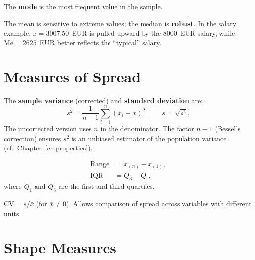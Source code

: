 \begin{definition}[Mode]
The \textbf{mode} is the most frequent value in the sample.
\end{definition}

\begin{intuition}
The mean is sensitive to extreme values; the median is \textbf{robust}. In the salary example, $\bar{x}=3007.50$~EUR is pulled upward by the 8000~EUR salary, while $\mathrm{Me}=2625$~EUR better reflects the ``typical'' salary.
\end{intuition}

\section{Measures of Spread}

\begin{definition}
The \textbf{sample variance} (corrected) and \textbf{standard deviation} are:
\[
s^2 = \frac{1}{n-1}\sum_{i=1}^{n}(x_i-\bar{x})^2, \qquad s = \sqrt{s^2}.
\]
The uncorrected version uses $n$ in the denominator. The factor $n-1$ (Bessel's correction) ensures $s^2$ is an unbiased estimator of the population variance (cf.\ Chapter~\ref{ch:properties}).
\end{definition}

\begin{definition}
\begin{align}
\text{Range} &= x_{(n)} - x_{(1)}, \\
\text{IQR} &= Q_3 - Q_1,
\end{align}
where $Q_1$ and $Q_3$ are the first and third quartiles.
\end{definition}

\begin{definition}
$\mathrm{CV} = s/\bar{x}$ (for $\bar{x}\neq 0$). Allows comparison of spread across variables with different units.
\end{definition}

\section{Shape Measures}

